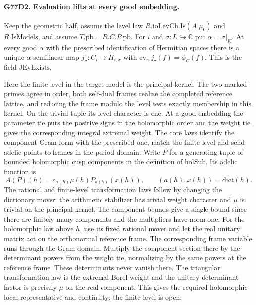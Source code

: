 \paragraph{G77D2. Evaluation lifts at every good embedding.}
Keep the geometric half, assume the level law
$R.\mathrm{toLevCh.Is}(A.\mu_0)$ and $R.\mathrm{IsModels}$, and assume $T.\mathrm{pb}=R.C.P.\mathrm{pb}$. For
$i$ and $\sigma:L\hookrightarrow\mathbb C$ put
$\alpha=\sigma|_K$. At every good $\alpha$ with the prescribed
identification of Hermitian spaces there is a unique
$\alpha$-semilinear map $j_\sigma:C_i\to H_{i,\sigma}$
with $\mathrm{ev}_{v_0}j_\sigma(f)=\phi_C(f)$.
This is the field $\mathrm{JEvExists}$.

Here the finite level in the target model is the principal kernel.
The two marked primes agree in order, both self-dual frames realize
the completed reference lattice, and reducing the frame modulo the
level tests exactly membership in this kernel. On the trivial
tuple its level character is one. At a good embedding the parameter
tie puts the positive signs in the holomorphic order and the
weight tie gives the corresponding integral extremal weight.
The core laws identify the component Gram form with the prescribed
one, match the finite level and send adelic points to frames in the
period domain. Write $P$ for a generating tuple of bounded
holomorphic cusp components in the definition of $\mathrm{holSub}$.
Its adelic function is
\[
 A(P)(h)=c_{a(h)}\mu(h)P_{a(h)}(x(h)),\qquad
 (a(h),x(h))=\mathrm{dict}(h).
\]
The rational and finite-level transformation laws follow by changing
the dictionary mover: the arithmetic stabilizer has trivial weight
character and $\mu$ is trivial on the principal kernel. The
component bounds give a single bound since there are finitely many
components and the multipliers have norm one. For the holomorphic
law above $h$, use its fixed rational mover and let the real unitary
matrix act on the orthonormal reference frame. The corresponding
frame variable runs through the Gram domain. Multiply the component
section there by the determinant powers from the weight tie,
normalizing by the same powers at the reference frame. These
determinants never vanish there. The triangular transformation law
is the extremal Borel weight and the unitary determinant factor
is precisely $\mu$ on the real component. This gives the required
holomorphic local representative and continuity; the finite level
is open.

